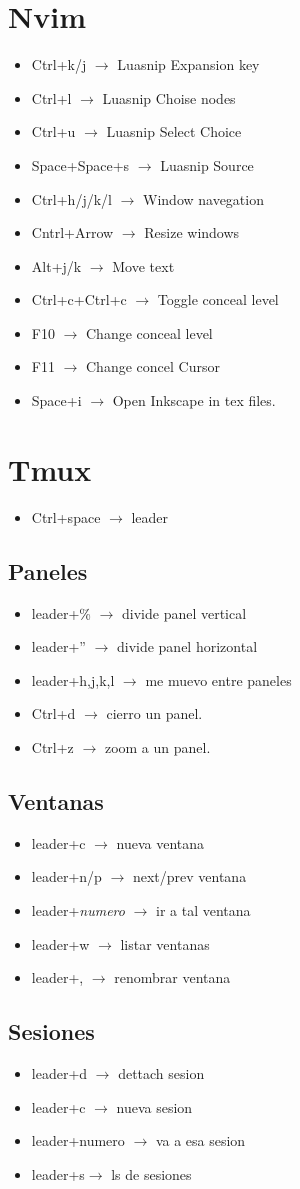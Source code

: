 \documentclass[a4paper,10pt]{article}
\begin{document}
\section{Nvim}
\begin{itemize}
  \item Ctrl+k/j $\to$ Luasnip Expansion key
  \item Ctrl+l  $\to$ Luasnip Choise nodes
  \item Ctrl+u $\to$ Luasnip Select Choice
  \item Space+Space+s $\to$ Luasnip Source
  \item Ctrl+h/j/k/l $\to$ Window navegation
  \item Cntrl+Arrow $\to$ Resize windows
  \item Alt+j/k $\to$ Move text
  \item Ctrl+c+Ctrl+c $\to$ Toggle conceal level
  \item F10 $\to$ Change conceal level
  \item F11 $\to$ Change concel Cursor
  \item Space+i $\to$ Open Inkscape in tex files.
\end{itemize}
\section{Tmux}
\begin{itemize}
  \item Ctrl+space $\to$ leader
\end{itemize}
\subsection{Paneles}
\begin{itemize}
  \item leader+\% $\to$ divide panel vertical
  \item leader+'' $\to$ divide panel horizontal
  \item leader+h,j,k,l $\to$ me muevo entre paneles
  \item Ctrl+d $\to$ cierro un panel.
  \item Ctrl+z $\to$ zoom a un panel.
\end{itemize}
\subsection{Ventanas}
\begin{itemize}
  \item leader+c $\to$ nueva ventana
  \item leader+n/p $\to$ next/prev ventana
  \item leader+\textit{numero} $\to$ ir a tal ventana
  \item leader+w $\to$ listar ventanas
  \item leader+, $\to$ renombrar ventana
\end{itemize}
\subsection{Sesiones}
\begin{itemize}
  \item leader+d $\to$ dettach sesion
  \item leader+c $\to$ nueva sesion
  \item leader+numero $\to$ va a esa sesion
  \item leader+s$\to$ ls de sesiones
\end{itemize}
\end{document}
